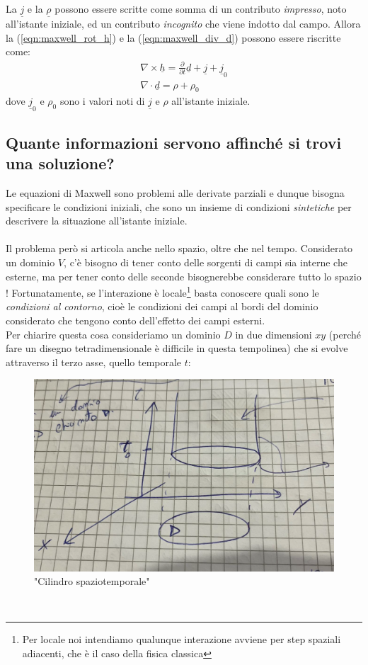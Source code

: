 \documentclass{book}
\begin{document}
        La $\underline{j}$ e la $\underline{\rho}$ possono essere scritte come somma di un contributo \textit{impresso}, noto all'istante iniziale, ed un contributo \textit{incognito} che viene indotto dal campo. Allora la (\ref{eqn:maxwell_rot_h}) e la (\ref{eqn:maxwell_div_d}) possono essere riscritte come:
        \begin{align}
            \nabla \times \underline{h} = \displaystyle \frac{\partial}{\partial t} \underline{d}+ \underline{j} + \underline{j}_{0} \\
            \nabla \cdot \underline{d} = \rho + \rho_{0}
        \end{align}
        dove $\underline{j}_{0}$ e $\rho_{0}$ sono i valori noti di $\underline{j}$ e $\rho$ all'istante iniziale.\\
        \subsection{Quante informazioni servono affinché si trovi una soluzione?}
        Le equazioni di Maxwell sono problemi alle derivate parziali e dunque bisogna specificare le condizioni iniziali, che sono un insieme di condizioni \textit{sintetiche} per descrivere la situazione all'istante iniziale.\\ \\
        Il problema però si articola anche nello spazio, oltre che nel tempo. Considerato un dominio $V$, c'è bisogno di tener conto delle sorgenti di campi sia interne che esterne, ma per tener conto delle seconde bisognerebbe considerare tutto lo spazio ! Fortunatamente, se l'interazione è locale\footnote{Per locale noi intendiamo qualunque interazione avviene per step spaziali adiacenti, che è il caso della fisica classica} basta conoscere quali sono le \textit{condizioni al contorno}, cioè le condizioni dei campi al bordi del dominio considerato che tengono conto dell'effetto dei campi esterni.\\
        Per chiarire questa cosa consideriamo un dominio $D$ in due dimensioni $xy$ (perché fare un disegno tetradimensionale è difficile in questa tempolinea) che si evolve attraverso il terzo asse, quello temporale $t$:
        \begin{figure}[h!]
            \centering
            \includegraphics[width=0.5\linewidth]{img/Chapter_one/Chapt1img1.png}
            \caption{"Cilindro spaziotemporale"}
            \label{fig:chapt1img1}
        \end{figure} \\
\end{document}
